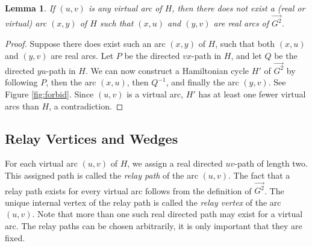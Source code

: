 \documentclass[12pt,letterpaper,oneside]{book}
\newtheorem{lemma}[theorem]{Lemma}
\begin{document}
\begin{lemma}\label{obsx} If $(u,v)$ is any virtual arc of $H$, then there does not exist a (real or virtual) 
arc $(x,y)$ of $H$ such that $(x,u)$ and $(y,v)$ are real arcs of $\vec{G^2}$. 
\end{lemma} 
\begin{proof} 
Suppose there does exist such an arc $(x,y)$ of $H$, such that 
both $(x,u)$ and $(y,v)$ are real arcs.  Let $P$ be the directed $vx$-path in $H$,  
and let $Q$ be the directed 
$yu$-path in $H$.  We can now construct a Hamiltonian cycle $H'$ of $\vec{G^2}$ by following $P$, then the arc $(x,u)$,  
then $Q^{-1}$, and finally the arc $(y,v)$.  See Figure \ref{fig:forbid}.  
Since $(u,v)$ is a virtual arc, $H'$ has at least one fewer virtual arcs than $H$,  
a contradiction. 

\end{proof} 


 

 \newpage
\subsection{Relay Vertices and Wedges}



For each virtual arc $(u,v)$ of $H$, we assign  
a real directed $uv$-path of length two.   
This assigned path is called the \emph{relay path} of the arc $(u,v)$.   
The fact that a relay path exists for every virtual arc follows from the definition of $\vec{G^2}$.   
The unique internal vertex of the relay path  
is called the \emph{relay vertex} of the arc $(u,v)$.  Note that more than one such real directed path may exist for  
a virtual arc.  The relay paths can be chosen arbitrarily, it is only important that they are fixed.   
   
 
 
\end{document}
